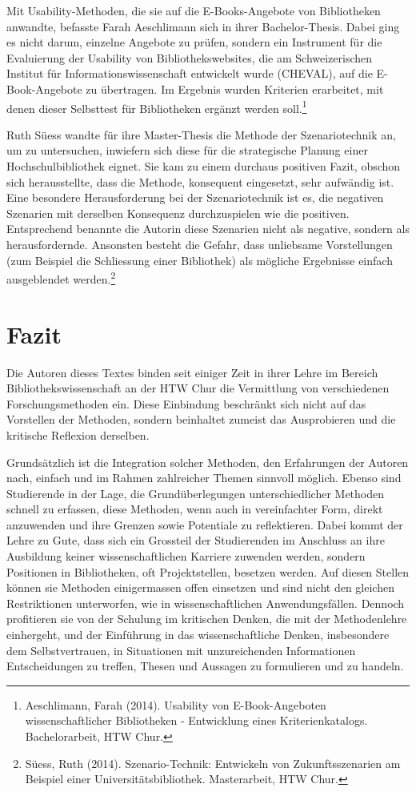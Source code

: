\documentclass[a4paper,
fontsize=11pt,
oneside,
numbers=noperiodatend,
parskip=half-,
bibliography=totoc,
final
]{scrartcl}
\begin{document}
Mit Usability-Methoden, die sie auf die E-Books-Angebote von
Bibliotheken anwandte, befasste Farah Aeschlimann sich in ihrer
Bachelor-Thesis. Dabei ging es nicht darum, einzelne Angebote zu prüfen,
sondern ein Instrument für die Evaluierung der Usability von
Bibliothekswebsites, die am Schweizerischen Institut für
Informationswissenschaft entwickelt wurde (CHEVAL), auf die
E-Book-Angebote zu übertragen. Im Ergebnis wurden Kriterien erarbeitet,
mit denen dieser Selbsttest für Bibliotheken ergänzt werden
soll.\footnote{Aeschlimann, Farah (2014). Usability von E-Book-Angeboten
  wissenschaftlicher Bibliotheken - Entwicklung eines Kriterienkatalogs.
  Bachelorarbeit, HTW Chur.}

Ruth Süess wandte für ihre Master-Thesis die Methode der Szenariotechnik
an, um zu untersuchen, inwiefern sich diese für die strategische Planung
einer Hochschulbibliothek eignet. Sie kam zu einem durchaus positiven
Fazit, obschon sich herausstellte, dass die Methode, konsequent
eingesetzt, sehr aufwändig ist. Eine besondere Herausforderung bei der
Szenariotechnik ist es, die negativen Szenarien mit derselben Konsequenz
durchzuspielen wie die positiven. Entsprechend benannte die Autorin
diese Szenarien nicht als negative, sondern als herausfordernde.
Ansonsten besteht die Gefahr, dass unliebsame Vorstellungen (zum
Beispiel die Schliessung einer Bibliothek) als mögliche Ergebnisse
einfach ausgeblendet werden.\footnote{Süess, Ruth (2014).
  Szenario-Technik: Entwickeln von Zukunftsszenarien am Beispiel einer
  Universitätsbibliothek. Masterarbeit, HTW Chur.}

\section*{Fazit}\label{fazit}

Die Autoren dieses Textes binden seit einiger Zeit in ihrer Lehre im
Bereich Bibliothekswissenschaft an der HTW Chur die Vermittlung von
verschiedenen Forschungsmethoden ein. Diese Einbindung beschränkt sich
nicht auf das Vorstellen der Methoden, sondern beinhaltet zumeist das
Ausprobieren und die kritische Reflexion derselben.

Grundsätzlich ist die Integration solcher Methoden, den Erfahrungen der
Autoren nach, einfach und im Rahmen zahlreicher Themen sinnvoll möglich.
Ebenso sind Studierende in der Lage, die Grundüberlegungen
unterschiedlicher Methoden schnell zu erfassen, diese Methoden, wenn
auch in vereinfachter Form, direkt anzuwenden und ihre Grenzen sowie
Potentiale zu reflektieren. Dabei kommt der Lehre zu Gute, dass sich ein
Grossteil der Studierenden im Anschluss an ihre Ausbildung keiner
wissenschaftlichen Karriere zuwenden werden, sondern Positionen in
Bibliotheken, oft Projektstellen, besetzen werden. Auf diesen Stellen
können sie Methoden einigermassen offen einsetzen und sind nicht den
gleichen Restriktionen unterworfen, wie in wissenschaftlichen
Anwendungsfällen. Dennoch profitieren sie von der Schulung im kritischen
Denken, die mit der Methodenlehre einhergeht, und der Einführung in das
wissenschaftliche Denken, insbesondere dem Selbstvertrauen, in
Situationen mit unzureichenden Informationen Entscheidungen zu treffen,
Thesen und Aussagen zu formulieren und zu handeln.
\end{document}
